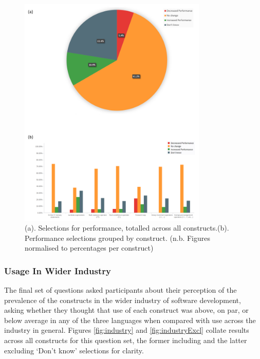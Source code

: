 \documentclass{article}
\begin{document}
            \begin{figure}[htbp]
                \centering
                \includegraphics[width=0.8\textwidth]{performance}
                \caption{(a). Selections for performance, totalled across all constructs.\newline(b). Performance selections grouped by construct. (n.b. Figures normalised to percentages per construct)}
                \label{fig:performance}
            \end{figure}   

        \newpage
        \subsubsection{Usage In Wider Industry}
            The final set of questions asked participants about their perception of the prevalence of the constructs in the wider industry of software development, asking whether they thought that use of each construct was above, on par, or below average in any of the three languages when compared with use across the industry in general. Figures \ref{fig:industry} and \ref{fig:industryExcl} collate results across all constructs for this question set, the former including and the latter excluding `Don't know' selections for clarity.
\end{document}
